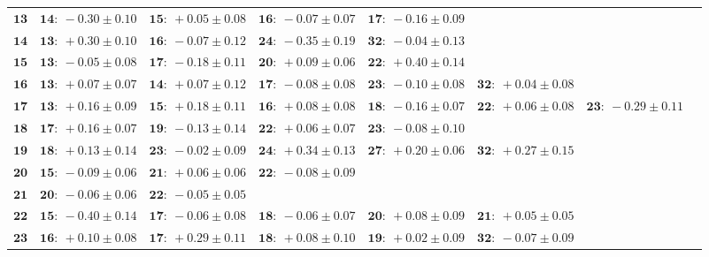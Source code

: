 \documentclass{article}
\begin{document}
\begin{sidewaystable}
        \footnotesize
        \begin{tabular}{r|lllllll}
            \hline
\( \mathbf{13} \)& \( \mathbf{14:}~-0.30 \pm 0.10 \)& \( \mathbf{15:}~+0.05 \pm 0.08 \)& \( \mathbf{16:}~-0.07 \pm 0.07 \)& \( \mathbf{17:}~-0.16 \pm 0.09 \)\\ 
\( \mathbf{14} \)& \( \mathbf{13:}~+0.30 \pm 0.10 \)& \( \mathbf{16:}~-0.07 \pm 0.12 \)& \( \mathbf{24:}~-0.35 \pm 0.19 \)& \( \mathbf{32:}~-0.04 \pm 0.13 \)\\ 
\( \mathbf{15} \)& \( \mathbf{13:}~-0.05 \pm 0.08 \)& \( \mathbf{17:}~-0.18 \pm 0.11 \)& \( \mathbf{20:}~+0.09 \pm 0.06 \)& \( \mathbf{22:}~+0.40 \pm 0.14 \)\\ 
\( \mathbf{16} \)& \( \mathbf{13:}~+0.07 \pm 0.07 \)& \( \mathbf{14:}~+0.07 \pm 0.12 \)& \( \mathbf{17:}~-0.08 \pm 0.08 \)& \( \mathbf{23:}~-0.10 \pm 0.08 \)& \( \mathbf{32:}~+0.04 \pm 0.08 \)\\ 
\( \mathbf{17} \)& \( \mathbf{13:}~+0.16 \pm 0.09 \)& \( \mathbf{15:}~+0.18 \pm 0.11 \)& \( \mathbf{16:}~+0.08 \pm 0.08 \)& \( \mathbf{18:}~-0.16 \pm 0.07 \)& \( \mathbf{22:}~+0.06 \pm 0.08 \)& \( \mathbf{23:}~-0.29 \pm 0.11 \)\\ 
\( \mathbf{18} \)& \( \mathbf{17:}~+0.16 \pm 0.07 \)& \( \mathbf{19:}~-0.13 \pm 0.14 \)& \( \mathbf{22:}~+0.06 \pm 0.07 \)& \( \mathbf{23:}~-0.08 \pm 0.10 \)\\ 
\( \mathbf{19} \)& \( \mathbf{18:}~+0.13 \pm 0.14 \)& \( \mathbf{23:}~-0.02 \pm 0.09 \)& \( \mathbf{24:}~+0.34 \pm 0.13 \)& \( \mathbf{27:}~+0.20 \pm 0.06 \)& \( \mathbf{32:}~+0.27 \pm 0.15 \)\\ 
\( \mathbf{20} \)& \( \mathbf{15:}~-0.09 \pm 0.06 \)& \( \mathbf{21:}~+0.06 \pm 0.06 \)& \( \mathbf{22:}~-0.08 \pm 0.09 \)\\ 
\( \mathbf{21} \)& \( \mathbf{20:}~-0.06 \pm 0.06 \)& \( \mathbf{22:}~-0.05 \pm 0.05 \)\\ 
\( \mathbf{22} \)& \( \mathbf{15:}~-0.40 \pm 0.14 \)& \( \mathbf{17:}~-0.06 \pm 0.08 \)& \( \mathbf{18:}~-0.06 \pm 0.07 \)& \( \mathbf{20:}~+0.08 \pm 0.09 \)& \( \mathbf{21:}~+0.05 \pm 0.05 \)\\ 
\( \mathbf{23} \)& \( \mathbf{16:}~+0.10 \pm 0.08 \)& \( \mathbf{17:}~+0.29 \pm 0.11 \)& \( \mathbf{18:}~+0.08 \pm 0.10 \)& \( \mathbf{19:}~+0.02 \pm 0.09 \)& \( \mathbf{32:}~-0.07 \pm 0.09 \)\\ 

\end{tabular}
\end{sidewaystable}
\end{document}
